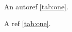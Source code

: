 \documentclass{article}
\begin{document}
An autoref \autoref{tab:one}.

A ref \ref{tab:one}.

\begin{island}

\end{island}
\end{document}
